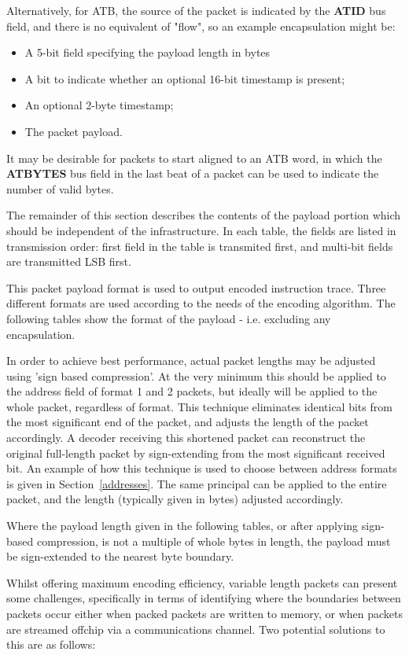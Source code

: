 Alternatively, for ATB, the source of the packet is indicated by the \textbf{ATID} bus field, and there is
no equivalent of "flow", so an example encapsulation might be:
\begin{itemize}
  \item A 5-bit field specifying the payload length in bytes
  \item A bit to indicate whether an optional 16-bit timestamp is present;
  \item An optional 2-byte timestamp;
  \item The packet payload.
\end{itemize}
It may be desirable for packets to start aligned to an ATB word, in which the \textbf{ATBYTES} bus field
in the last beat of a packet can be used to indicate the number of valid bytes.

The remainder of this section describes the contents of the payload
portion which should be independent of the infrastructure.  In each table, the fields are listed in
transmission order: first field in the table is transmited first, and multi-bit fields are 
transmitted LSB first.

This packet payload format is used to output encoded instruction
trace.  Three different formats are used according to the needs of the
encoding algorithm. The following tables show the format of the
payload - i.e. excluding any encapsulation.

In order to achieve best performance, actual packet lengths may be adjusted using 'sign based compression'.
At the very minimum this should be applied to the address field of format 1 and 2 packets, but ideally will 
be applied to the whole packet, regardless of format.  This technique eliminates identical bits from the most 
significant end of the packet, and adjusts the length of the packet accordingly.  A decoder receiving this 
shortened packet can reconstruct the original full-length packet by sign-extending from the most significant
received bit.  An example of how this technique is used to choose between address formats is given in 
Section~\ref{addresses}.  The same principal can be applied to the entire packet, and the length (typically 
given in bytes) adjusted accordingly.

Where the payload length given in the following tables, or after applying sign-based compression, is not a 
multiple of whole bytes in length, the payload must be sign-extended to the nearest byte boundary.

Whilst offering maximum encoding efficiency, variable length packets can present some challenges,
specifically in terms of identifying where the boundaries between packets occur either when packed
packets are written to memory, or when packets are streamed offchip via a communications channel.  Two 
potential solutions to this are as follows:

